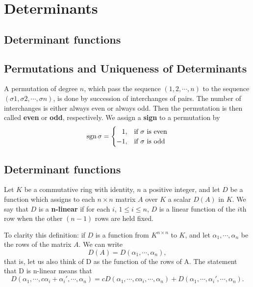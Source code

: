 \documentclass[main.tex]{subfiles}
\begin{document}
\chapter{Determinants}
\section{Determinant functions}

\section{Permutations and Uniqueness of Determinants}
A permutation of degree $n$, which pass the sequence $(1, 2, \cdots, n)$ to the sequence $(\sigma 1, \sigma 2, \cdots, \sigma n )$, is done by succession of interchanges of pairs. The number of interchanges is either always even or always odd. Then the permutation is then called \textbf{even} or \textbf{odd}, respectively. 
We assign a \textbf{sign} to a permutation by
\begin{equation}
    \text{sgn\,} \sigma = \begin{cases}
     \hphantom{-}1, & \text{if } \sigma \text{ is even} \\
    -1, & \text{if } \sigma \text{ is odd} 
    \end{cases}
\end{equation}

\section{Determinant functions}
\begin{definition}
Let $K$ be a commutative ring with identity, $n$ a positive integer, and let $D$ be a function which assigns to each $n \times n$ matrix $A$ over $K$ a scalar $D(A)$ in $K$. We say that $D$ is a \textbf{n-linear} if for each $i$, $1 \leq i \leq n$, $D$ is a linear function of the $i$th row when the other $(n - 1)$ rows are held fixed. 
\end{definition}

To clarity this definition: if $D$ is a function from $K^{n \times n}$ to $K$, and let $\alpha_1, \cdots, \alpha_n$ be the rows of the matrix $A$. We can write 
\begin{equation*}
    D(A) = D(\alpha_1, \cdots, \alpha_n),
\end{equation*}
that is, let us also think of D as the function of the rows of A. The statement that D is n-linear means that
\begin{equation}\label{n-linear_function}
    D(\alpha_1,\cdots, c\alpha_i + \alpha_i', \cdots, \alpha_n) = cD(\alpha_1,\cdots, c\alpha_i, \cdots, \alpha_n) + D(\alpha_1,\cdots, \alpha_i', \cdots, \alpha_n). 
\end{equation}
\end{document}
